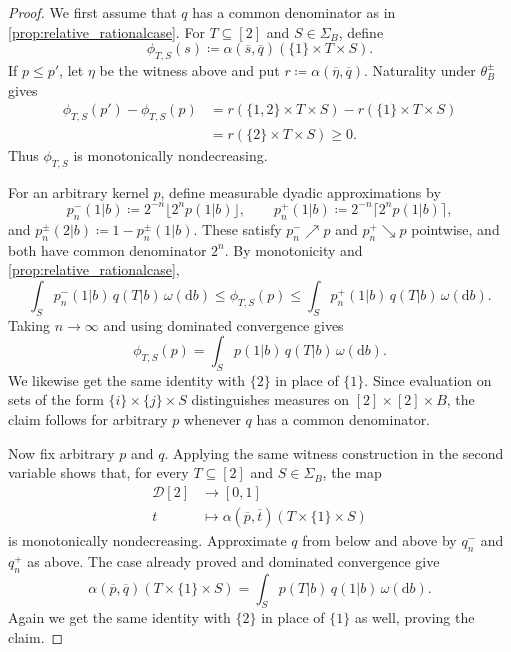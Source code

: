 \documentclass[11pt,a4paper]{scrartcl}
\newcommand{\dx}{\mathrm{d}}
\newcommand{\finiteset}[1]{[#1]}	%
\newcommand{\two}{\finiteset{2}}		%
\newcommand{\dist}{\mathcal{D}}
\theoremstyle{definition}
\begin{document}
\begin{proof}
	We first assume that $q$ has a common denominator as in \cref{prop:relative_rationalcase}.
	For $T \subseteq \two$ and $S \in \Sigma_B$, define
	\[
		\phi_{T,S}(s) \coloneq
		\alpha(\overline{s},\overline{q})(\{1\} \times T \times S).
	\]
	If $p \leq p'$, let $\eta$ be the witness above and put
	$r \coloneq \alpha(\overline{\eta},\overline{q})$.
	Naturality under $\theta_B^\pm$ gives
	\begin{align*}
		\phi_{T,S}(p')-\phi_{T,S}(p)
		&= r(\{1,2\} \times T \times S)-r(\{1\} \times T \times S) \\
		&= r(\{2\} \times T \times S) \geq 0.
	\end{align*}
	Thus $\phi_{T,S}$ is monotonically nondecreasing.

	For an arbitrary kernel $p$, define measurable dyadic approximations by
	\[
		p_n^-(1|b) \coloneq 2^{-n}\lfloor 2^n p(1|b)\rfloor,
		\qquad
		p_n^+(1|b) \coloneq 2^{-n}\lceil 2^n p(1|b)\rceil,
	\]
	and $p_n^\pm(2|b) \coloneq 1-p_n^\pm(1|b)$.
	These satisfy $p_n^- \nearrow p$ and $p_n^+ \searrow p$ pointwise, and both have common denominator $2^n$.
	By monotonicity and \cref{prop:relative_rationalcase},
	\[
		\int_S p_n^-(1|b) \, q(T|b) \, \omega(\dx b)
		\leq \phi_{T,S}(p)
		\leq \int_S p_n^+(1|b) \, q(T|b)\,\omega(\dx b).
	\]
	Taking $n \to \infty$ and using dominated convergence gives
	\[
		\phi_{T,S}(p) = \int_S p(1|b) \, q(T|b) \, \omega(\dx b).
	\]
	We likewise get the same identity with $\{2\}$ in place of $\{1\}$.
	Since evaluation on sets of the form $\{i\} \times \{j\} \times S$ distinguishes measures on $\two \times \two \times B$,
	the claim follows for arbitrary $p$ whenever $q$ has a common denominator.

	Now fix arbitrary $p$ and $q$.
	Applying the same witness construction in the second variable shows that, for every $T \subseteq \two$ and $S \in \Sigma_B$, the map
	\begin{align*}
		\dist\two & \longrightarrow [0,1] \\
		t & \longmapsto \alpha(\overline{p},\overline{t})(T \times \{1\} \times S)
	\end{align*}
	is monotonically nondecreasing.
	Approximate $q$ from below and above by $q_n^-$ and $q_n^+$ as above.
	The case already proved and dominated convergence give
	\[
		\alpha(\overline{p},\overline{q})(T \times \{1\} \times S)
		= \int_S p(T|b) \, q(1|b) \, \omega(\dx b).
	\]
	Again we get the same identity with $\{2\}$ in place of $\{1\}$ as well, proving the claim.
\end{proof}
\end{document}
